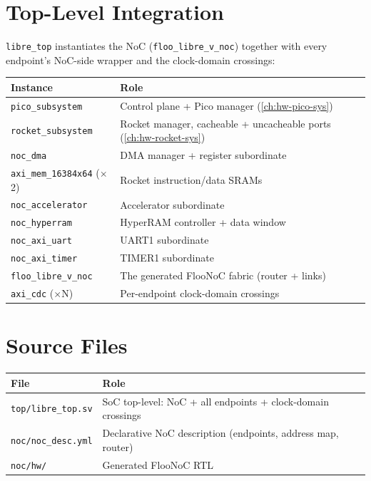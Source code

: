 \section{Top-Level Integration}
\texttt{libre\_top} instantiates the NoC (\texttt{floo\_libre\_v\_noc}) together with every endpoint's
NoC-side wrapper and the clock-domain crossings:

\begin{tabular}{@{}ll@{}}
\toprule
\textbf{Instance} & \textbf{Role} \\
\midrule
\texttt{pico\_subsystem}        & Control plane + Pico manager (\autoref{ch:hw-pico-sys}) \\
\texttt{rocket\_subsystem}      & Rocket manager, cacheable + uncacheable ports (\autoref{ch:hw-rocket-sys}) \\
\texttt{noc\_dma}               & DMA manager + register subordinate \\
\texttt{axi\_mem\_16384x64} ($\times$2) & Rocket instruction/data SRAMs \\
\texttt{noc\_accelerator}       & Accelerator subordinate \\
\texttt{noc\_hyperram}          & HyperRAM controller + data window \\
\texttt{noc\_axi\_uart}         & UART1 subordinate \\
\texttt{noc\_axi\_timer}        & TIMER1 subordinate \\
\texttt{floo\_libre\_v\_noc}    & The generated FlooNoC fabric (router + links) \\
\texttt{axi\_cdc} ($\times$N)   & Per-endpoint clock-domain crossings \\
\bottomrule
\end{tabular}

\section{Source Files}

\begin{tabular}{@{}ll@{}}
\toprule
\textbf{File} & \textbf{Role} \\
\midrule
\texttt{top/libre\_top.sv} & SoC top-level: NoC + all endpoints + clock-domain crossings \\
\texttt{noc/noc\_desc.yml} & Declarative NoC description (endpoints, address map, router) \\
\texttt{noc/hw/} & Generated FlooNoC RTL \\
\bottomrule
\end{tabular}

\newpage

